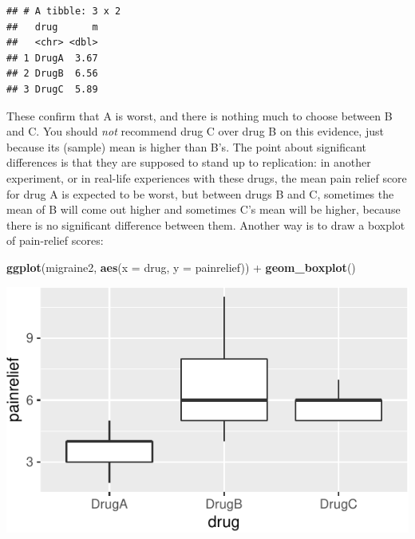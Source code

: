 \documentclass[]{tufte-book}
\newenvironment{Shaded}{}{}
\newcommand{\DataTypeTok}[1]{\textcolor[rgb]{0.56,0.13,0.00}{#1}}
\newcommand{\KeywordTok}[1]{\textcolor[rgb]{0.00,0.44,0.13}{\textbf{#1}}}
\newcommand{\NormalTok}[1]{#1}
\newcommand{\OperatorTok}[1]{\textcolor[rgb]{0.40,0.40,0.40}{#1}}
\newcommand{\StringTok}[1]{\textcolor[rgb]{0.25,0.44,0.63}{#1}}
\theoremstyle{definition}
\theoremstyle{definition}
\theoremstyle{definition}
\theoremstyle{remark}
\begin{document}
\begin{Shaded}
\end{Shaded}

\begin{verbatim}
## # A tibble: 3 x 2
##   drug      m
##   <chr> <dbl>
## 1 DrugA  3.67
## 2 DrugB  6.56
## 3 DrugC  5.89
\end{verbatim}

These confirm that A is worst, and there is nothing much to choose
between B and C. You should \emph{not} recommend drug C over drug B on
this evidence, just because its (sample) mean is higher than B's. The
point about significant differences is that they are supposed to stand
up to replication: in another experiment, or in real-life experiences
with these drugs, the mean pain relief score for drug A is expected to
be worst, but between drugs B and C, sometimes the mean of B will come
out higher and sometimes C's mean will be higher, because there is no
significant difference between them.
Another way is to draw a boxplot of pain-relief scores:

\begin{Shaded}
\begin{Highlighting}[]
\KeywordTok{ggplot}\NormalTok{(migraine2, }\KeywordTok{aes}\NormalTok{(}\DataTypeTok{x =}\NormalTok{ drug, }\DataTypeTok{y =}\NormalTok{ painrelief)) }\OperatorTok{+}\StringTok{ }
\StringTok{    }\KeywordTok{geom_boxplot}\NormalTok{()}
\end{Highlighting}
\end{Shaded}

\includegraphics{11-tidying-and-selecting-data_files/figure-latex/unnamed-chunk-49-1}
\end{document}
